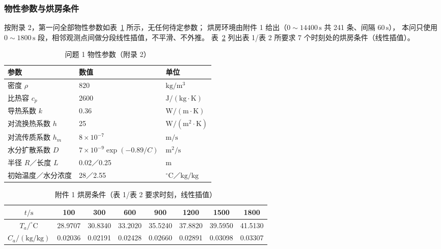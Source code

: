 \subsubsection{物性参数与烘房条件}

按附录 2，第一问全部物性参数如表~\ref{tab:params} 所示，无任何待定参数；
烘房环境由附件 1 给出（$0\sim14400\,\mathrm{s}$ 共 241 条、间隔 $60\,\mathrm{s}$），
本问只使用 $0\sim1800\,\mathrm{s}$ 段，相邻观测点间做分段线性插值，不平滑、不外推。
表~\ref{tab:air} 列出表 1/表 2 所要求 7 个时刻处的烘房条件（线性插值）。

\begin{table}[htbp]
  \centering
  \caption{问题 1 物性参数（附录 2）}
  \label{tab:params}
  \begin{tabular}{lll}
    \hline
    参数 & 数值 & 单位 \\
    \hline
    密度 $\rho$ & 820 & $\mathrm{kg/m^3}$ \\
    比热容 $c_p$ & 2600 & $\mathrm{J/(kg\cdot K)}$ \\
    导热系数 $k$ & 0.36 & $\mathrm{W/(m\cdot K)}$ \\
    对流换热系数 $h$ & 25 & $\mathrm{W/(m^2\cdot K)}$ \\
    对流传质系数 $h_m$ & $8\times10^{-7}$ & $\mathrm{m/s}$ \\
    水分扩散系数 $D$ & $7\times10^{-9}\exp(-0.89/C)$ & $\mathrm{m^2/s}$ \\
    半径 $R$／长度 $L$ & 0.02／0.25 & $\mathrm{m}$ \\
    初始温度／水分浓度 & 28／2.55 & $^{\circ}\mathrm{C}$／$\mathrm{kg/kg}$ \\
    \hline
  \end{tabular}
\end{table}

\begin{table}[htbp]
  \centering
  \caption{附件 1 烘房条件（表 1/表 2 要求时刻，线性插值）}
  \label{tab:air}
  \begin{tabular}{cccccccc}
    \hline
    $t/\mathrm{s}$ & 100 & 300 & 600 & 900 & 1200 & 1500 & 1800 \\
    \hline
    $T_a/^{\circ}\mathrm{C}$ & 28.9707 & 30.8340 & 33.2020 & 35.5240 & 37.8820 & 39.5950 & 41.5130 \\
    $C_a/(\mathrm{kg/kg})$ & 0.02036 & 0.02191 & 0.02428 & 0.02660 & 0.02891 & 0.03098 & 0.03307 \\
    \hline
  \end{tabular}
\end{table}

